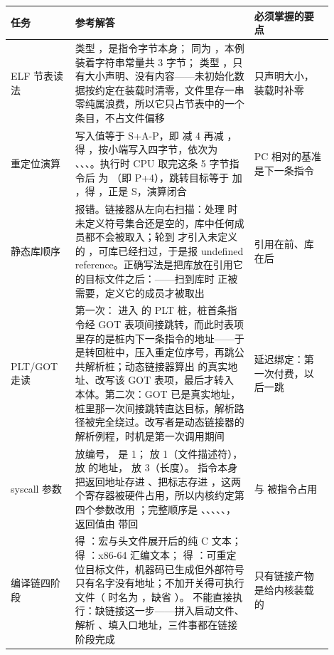 \begin{longtable}{L{0.18\linewidth}L{0.5\linewidth}L{0.22\linewidth}}
\toprule
任务 & 参考解答 & 必须掌握的要点 \\
\midrule
ELF 节表读法 &  类型 ，是指令字节本身； 同为 ，本例装着字符串常量共 3 字节； 类型 ，只有大小声明、没有内容——未初始化数据按约定在装载时清零，文件里存一串零纯属浪费，所以它只占节表中的一个条目，不占文件偏移 &  只声明大小，装载时补零 \\
重定位演算 & 写入值等于 S+A-P，即  减 4 再减 ，得 ，按小端写入四字节，依次为 、、、。执行时 CPU 取完这条 5 字节指令后  为 （即 P+4），跳转目标等于  加 ，得 ，正是 S，演算闭合 & PC 相对的基准是下一条指令 \\
静态库顺序 &  报错。链接器从左向右扫描：处理  时未定义符号集合还是空的，库中任何成员都不会被取入；轮到  才引入未定义的 ，可库已经扫过，于是报 undefined reference。正确写法是把库放在引用它的目标文件之后：——扫到库时  正被需要，定义它的成员才被取出 & 引用在前、库在后 \\
PLT/GOT 走读 & 第一次： 进入  的 PLT 桩，桩首条指令经 GOT 表项间接跳转，而此时表项里存的是桩内下一条指令的地址——于是转回桩中，压入重定位序号，再跳公共解析桩；动态链接器算出  的真实地址、改写该 GOT 表项，最后才转入  本体。第二次：GOT 已是真实地址，桩里那一次间接跳转直达目标，解析路径被完全绕过。改写者是动态链接器的解析例程，时机是第一次调用期间 & 延迟绑定：第一次付费，以后一跳 \\
syscall 参数 &  放编号， 是 1； 放 1（文件描述符）， 放  的地址， 放 3（长度）。 指令本身把返回地址存进 、把标志存进 ，这两个寄存器被硬件占用，所以内核约定第四个参数改用 ；完整顺序是 、、、、、，返回值由  带回 &  与  被指令占用 \\
编译链四阶段 &  得 ：宏与头文件展开后的纯 C 文本； 得 ：x86-64 汇编文本； 得 ：可重定位目标文件，机器码已生成但外部符号只有名字没有地址；不加开关得可执行文件（ 时名为 ，缺省 ）。 不能直接执行：缺链接这一步——拼入启动文件、解析 、填入口地址，三件事都在链接阶段完成 & 只有链接产物是给内核装载的 \\
\bottomrule
\end{longtable}
